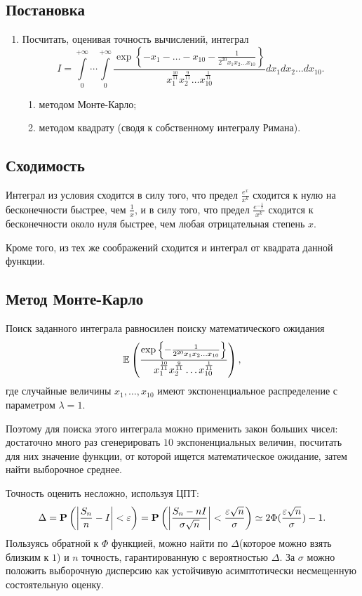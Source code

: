\documentclass[12pt, a4paper]{article}
\begin{document}
\subsection{Постановка}
\begin{enumerate}
\item Посчитать, оценивая точность вычислений, интеграл 
\[ I = \int\limits_{0}^{+\infty}\cdots \int\limits_{0}^{+\infty} 
	\frac {\exp\left\{ -x_1-\dots-x_{10}-\frac{1}{2^{20} x_1 x_2\dots x_{10}} \right\}}
	{x_1^\frac{10}{11}x_2^\frac{9}{11}\dots x_{10}^\frac{1}{11}}
dx_1 dx_2 \dots dx_{10}.	
\]
\begin{enumerate} %
\item методом Монте-Карло;
\item методом квадрату (сводя к собственному интегралу Римана).
\end{enumerate}
\end{enumerate}

\subsection{Сходимость}
Интеграл из условия сходится в силу того, что предел $\frac {e^x}{x^k}$ сходится к нулю на бесконечности быстрее, чем $\frac 1x$, и в силу того, что предел $\frac{e^{-\frac{1}{x}}}{x^k}$ сходится к бесконечности около нуля быстрее, чем любая отрицательная степень $x$.

Кроме того, из тех же соображений сходится и интеграл от квадрата данной функции.

\subsection{Метод Монте-Карло}
Поиск заданного интеграла равносилен поиску математического ожидания
\[ \E\left( 
\frac {\exp\left\{-\frac{1}{2^{20} x_1 x_2\dots x_{10}} \right\}}
	{x_1^\frac{10}{11}x_2^\frac{9}{11}\dots x_{10}^\frac{1}{11}}
 \right), \]
 где случайные величины $x_1,\dots,x_{10}$ имеют экспоненциальное распределение с параметром $\lambda=1$.

Поэтому для поиска этого интеграла можно применить закон больших чисел: достаточно много раз сгенерировать $10$ экспоненциальных величин, посчитать для них значение функции, от которой ищется математическое ожидание, затем найти выборочное среднее.

Точность оценить несложно, используя ЦПТ:
\[ \Delta = \P\left(\left|\frac{S_n}{n}-I\right|<\varepsilon\right) = 
	\P \left( \left| \frac {S_n - nI}{\sigma \sqrt{n}}\right| < \frac{\varepsilon \sqrt{n}}{\sigma} \right) \simeq 2\Phi(\frac{\varepsilon \sqrt{n}}{\sigma}) - 1.	
\] Пользуясь обратной к $\Phi$ функцией, можно найти по $\Delta$(которое можно взять близким к $1$) и $n$ точность, гарантированную с вероятностью $\Delta$. За $\sigma$ можно положить выборочную дисперсию как устойчивую асимптотически несмещенную состоятельную оценку.
\end{document}
